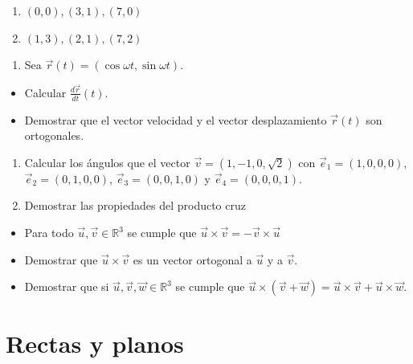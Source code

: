 \documentclass[
]{article}
\providecommand{\tightlist}{%
  \setlength{\itemsep}{0pt}\setlength{\parskip}{0pt}}
\begin{document}
\begin{enumerate}
\def\labelenumi{\alph{enumi})}
\item
  \((0,0),(3,1),(7,0)\)
\item
  \((1,3),(2,1),(7,2)\)
\end{enumerate}

\begin{enumerate}
\def\labelenumi{\arabic{enumi}.}
\tightlist
\item
  Sea \(\vec{r}(t)=(\cos\omega t, \sin \omega t)\).
\end{enumerate}

\begin{itemize}
\item
  Calcular \(\frac{d\vec{r}}{dt}(t)\).
\item
  Demostrar que el vector velocidad y el vector desplazamiento
  \(\vec{r}(t)\) son ortogonales.
\end{itemize}

\begin{enumerate}
\def\labelenumi{\arabic{enumi}.}
\item
  Calcular los ángulos que el vector \(\vec{v}=(1,-1,0,\sqrt{2})\) con
  \(\vec{e}_1=(1,0,0,0)\), \(\vec{e}_2=(0,1,0,0)\),
  \(\vec{e}_3=(0,0,1,0)\) y \(\vec{e}_4=(0,0,0,1)\).
\item
  Demostrar las propiedades del producto cruz
\end{enumerate}

\begin{itemize}
\item
  Para todo \(\vec{u},\vec{v}\in\mathbb{R}^3\) se cumple que
  \(\vec{u} \times \vec{v}=- \vec{v} \times \vec{u}\)
\item
  Demostrar que \(\vec{u}\times \vec{v}\) es un vector ortogonal a
  \(\vec{u}\) y a \(\vec{v}\).
\item
  Demostrar que si \(\vec{u},\vec{v},\vec{w}\in\mathbb{R}^3\) se cumple
  que
  \(\vec{u} \times (\vec{v}+\vec{w})= \vec{u}\times \vec{v} + \vec{u}\times \vec{w}\).
\end{itemize}

\hypertarget{rectas-y-planos}{%
\section{Rectas y planos}\label{rectas-y-planos}}
\end{document}
